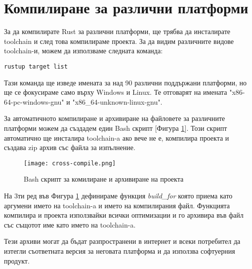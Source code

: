 \section{Компилиране за различни платформи}
За да компилирате Rust за различни платформи, ще трябва да инсталирате
toolchain и след това компилираме проекта. За да видим различните видове
toolchain-и, можем да използваме следната команда:
\begin{lstlisting}
rustup target list
\end{lstlisting}
Тази команда ще изведе имената за над 90 различни поддържани платформи, но ще
се фокусираме само върху Windows и Linux. Те отговарят на имената
"x86-64-pc-windows-gnu" и "x86\_64-unknown-linux-gnu".

За автоматичното компилиране и архивиране на файловете за различните платформи
можем да създадем един Bash скрипт [Фигура \ref{fig:cross-compile}]. Този
скрипт автоматично ще инсталира toolchain-a ако вече не е, компилира проекта и
създава zip архив със файла за изпълнение.

\begin{figure}[!htb]
  \texttt{[image: cross-compile.png]}
  \centering
  \caption{Bash скрипт за комилиране и архивиране на проекта}
  \label{fig:cross-compile}
\end{figure}

На 3ти ред във Фигура \ref{fig:cross-compile} дефинираме функция
\textit{build\_for} която приема като аргумени името на toolchain-a и името на
компилирания файл. Функцията компилира и проекта използвайки всички оптимизации
и го архивира във файл със същотот име като името на toolchain-a.

Тези архиви могат да бъдат разпространени в интернет и всеки потребител да
изтегли съответната версия за неговата платформа и да използва софтуерния
продукт.
